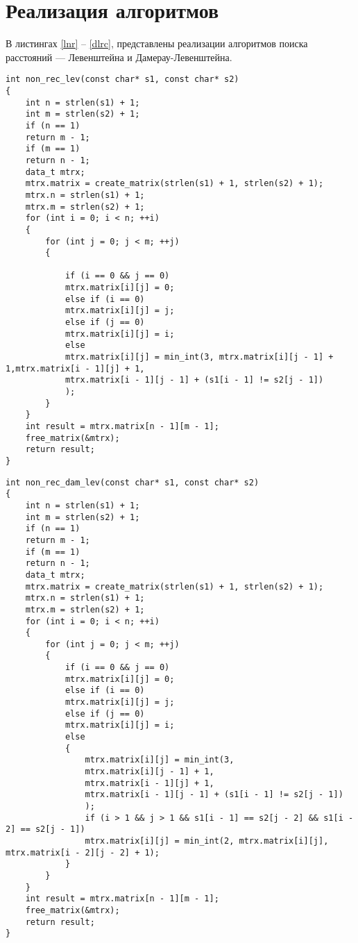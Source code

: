 \section{Реализация алгоритмов}
В листингах \ref{lnr} --  \ref{dlrc}, представлены реализации алгоритмов поиска расстояний --- Левенштейна и Дамерау-Левенштейна. 
\begin{center}
\begin{lstlisting}[label=lnr, caption={Матричный алгоритм поиска пути Левенштейна}]
int non_rec_lev(const char* s1, const char* s2)
{
	int n = strlen(s1) + 1;
	int m = strlen(s2) + 1;
	if (n == 1)
	return m - 1;
	if (m == 1)
	return n - 1;	
	data_t mtrx;
	mtrx.matrix = create_matrix(strlen(s1) + 1, strlen(s2) + 1);
	mtrx.n = strlen(s1) + 1;
	mtrx.m = strlen(s2) + 1;
	for (int i = 0; i < n; ++i)
	{	
		for (int j = 0; j < m; ++j)
		{
			
			if (i == 0 && j == 0)
			mtrx.matrix[i][j] = 0;
			else if (i == 0)
			mtrx.matrix[i][j] = j;
			else if (j == 0)
			mtrx.matrix[i][j] = i;
			else
			mtrx.matrix[i][j] = min_int(3, mtrx.matrix[i][j - 1] + 1,mtrx.matrix[i - 1][j] + 1,
			mtrx.matrix[i - 1][j - 1] + (s1[i - 1] != s2[j - 1])
			);
		}
	}
	int result = mtrx.matrix[n - 1][m - 1];
	free_matrix(&mtrx);
	return result;
}
\end{lstlisting}
\end{center}
\begin{center}
\begin{lstlisting}[label=dlnr, caption={Матричный алгоритм поиска пути  Дамерау-Левенштейна}]
int non_rec_dam_lev(const char* s1, const char* s2)
{
	int n = strlen(s1) + 1;
	int m = strlen(s2) + 1;
	if (n == 1)
	return m - 1;
	if (m == 1)
	return n - 1;
	data_t mtrx;
	mtrx.matrix = create_matrix(strlen(s1) + 1, strlen(s2) + 1);
	mtrx.n = strlen(s1) + 1;
	mtrx.m = strlen(s2) + 1;
	for (int i = 0; i < n; ++i)
	{
		for (int j = 0; j < m; ++j)
		{
			if (i == 0 && j == 0)
			mtrx.matrix[i][j] = 0;
			else if (i == 0)
			mtrx.matrix[i][j] = j;
			else if (j == 0)
			mtrx.matrix[i][j] = i;
			else
			{
				mtrx.matrix[i][j] = min_int(3,
				mtrx.matrix[i][j - 1] + 1,
				mtrx.matrix[i - 1][j] + 1,
				mtrx.matrix[i - 1][j - 1] + (s1[i - 1] != s2[j - 1])
				);
				if (i > 1 && j > 1 && s1[i - 1] == s2[j - 2] && s1[i - 2] == s2[j - 1])
				mtrx.matrix[i][j] = min_int(2, mtrx.matrix[i][j], mtrx.matrix[i - 2][j - 2] + 1);
			}
		}
	}
	int result = mtrx.matrix[n - 1][m - 1];
	free_matrix(&mtrx);
	return result;
}
\end{lstlisting}
\end{center}
